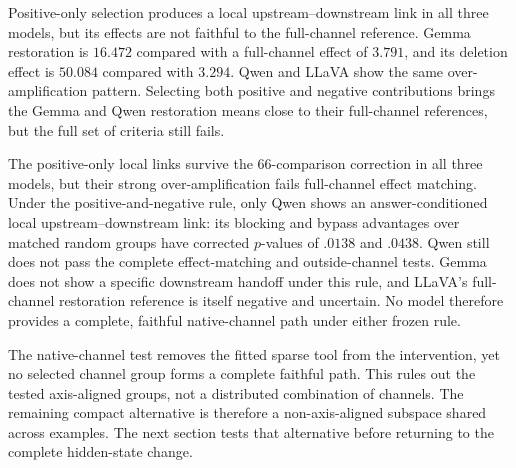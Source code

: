 

Positive-only selection produces a local upstream--downstream link in all three models, but its effects are not faithful to the full-channel reference. Gemma restoration is $16.472$ compared with a full-channel effect of $3.791$, and its deletion effect is $50.084$ compared with $3.294$. Qwen and LLaVA show the same over-amplification pattern. Selecting both positive and negative contributions brings the Gemma and Qwen restoration means close to their full-channel references, but the full set of criteria still fails.

The positive-only local links survive the 66-comparison correction in all three models, but their strong over-amplification fails full-channel effect matching. Under the positive-and-negative rule, only Qwen shows an answer-conditioned local upstream--downstream link: its blocking and bypass advantages over matched random groups have corrected $p$-values of $.0138$ and $.0438$. Qwen still does not pass the complete effect-matching and outside-channel tests. Gemma does not show a specific downstream handoff under this rule, and LLaVA's full-channel restoration reference is itself negative and uncertain. No model therefore provides a complete, faithful native-channel path under either frozen rule.

The native-channel test removes the fitted sparse tool from the intervention, yet no selected channel group forms a complete faithful path. This rules out the tested axis-aligned groups, not a distributed combination of channels. The remaining compact alternative is therefore a non-axis-aligned subspace shared across examples. The next section tests that alternative before returning to the complete hidden-state change.

\FloatBarrier

